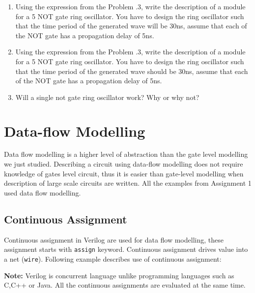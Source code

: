 \documentclass[a4paper,10pt]{article}
\theoremstyle{mytheor}
\newcommand{
  \insertverilog}[3]{
  
}
\newcounter{problemNumber}
\begin{document}
{\begin {enumerate}
  \item Using the expression from the Problem {\theproblemNumber}.3,
    write the description of a module for a 5 NOT gate ring
    oscillator. You have to design the ring oscillator such that the
    time period of the generated wave will be 30ns, assume that each
    of the NOT gate has a propagation delay of 5ns.

  \item Using the expression from the Problem {\theproblemNumber}.3,
    write the description of a module for a 5 NOT gate ring
    oscillator. You have to design the ring oscillator such that the
    time period of the generated wave should be 30ns, assume that each
    of the NOT gate has a propagation delay of 5ns.
  \item Will a single not gate ring oscillator work? Why or why not?
  \end{enumerate}
} 


\section{Data-flow Modelling}
Data flow modelling is a higher level of abstraction than the gate
level modelling we just studied. Describing a circuit using data-flow
modelling does not require knowledge of gates level circuit, thus it
is easier than gate-level modelling when description of large scale
circuits are written.  All the examples from Assignment 1 used data
flow modelling.

\subsection{Continuous Assignment}
\label{continuous-assignment}
Continuous assignment in Verilog are used for data flow modelling,
these assignment starts with
\lstinline[style=verilog-inline-style]{assign} keyword. Continuous
assignment drives value into a net
(\lstinline[style=verilog-inline-style]{wire}). Following example
describes use of continuous assignment:

{\color{red}\textbf{Note:}} Verilog is concurrent language unlike
programming languages such as C,C++ or Java. All the continuous
assignments are evaluated at the same time.

\insertverilog{./verilog_files/continuousAssignment.v}{continuous-assignment}{Example usage of continuous assignment.}
\end{document}
